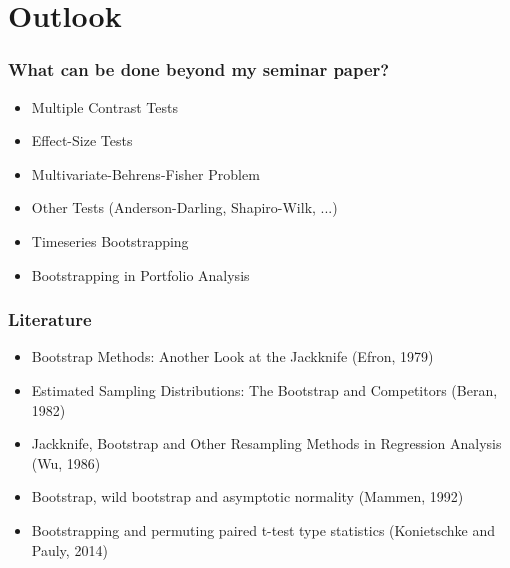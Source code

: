 \documentclass[9pt, dvipsnames]{beamer} %
\begin{document}
   	\section{Outlook}
	\begin{frame}
		\frametitle{\textbf{What can be done beyond my seminar paper?}}
		\begin{itemize}
			\item Multiple Contrast Tests
			\item Effect-Size Tests
			\item Multivariate-Behrens-Fisher Problem
			\item Other Tests (Anderson-Darling, Shapiro-Wilk, ...)
			\item Timeseries Bootstrapping
			\item Bootstrapping in Portfolio Analysis
			
		\end{itemize}
	\end{frame}
	\begin{frame}
		\frametitle{Literature}
			\begin{itemize}
				\item Bootstrap Methods: Another Look at the Jackknife (Efron, 1979)
				\item Estimated Sampling Distributions: The Bootstrap and Competitors (Beran, 1982)
				\item Jackknife, Bootstrap and Other Resampling Methods in Regression Analysis (Wu, 1986)
				\item Bootstrap, wild bootstrap and asymptotic normality (Mammen, 1992)
				\item Bootstrapping and permuting paired t-test type statistics (Konietschke and Pauly, 2014)
			\end{itemize}
	\end{frame}
\end{document}
